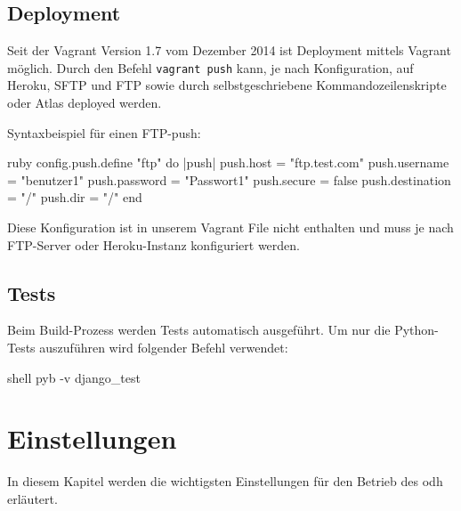 \subsection{Deployment}
Seit der Vagrant Version 1.7 vom Dezember 2014 ist Deployment mittels Vagrant möglich. Durch den Befehl \texttt{vagrant push} kann, je nach Konfiguration, auf Heroku, SFTP und FTP sowie durch selbstgeschriebene Kommandozeilenskripte oder Atlas deployed werden.

Syntaxbeispiel für einen FTP-push: \cite{vagrant-deployment}
\begin{src}{ruby}
config.push.define "ftp" do |push|
  push.host = "ftp.test.com"
  push.username = "benutzer1"
  push.password = "Passwort1"
  push.secure = false
  push.destination = "/"
  push.dir = "/"
end
\end{src}
Diese Konfiguration ist in unserem Vagrant File nicht enthalten und muss je nach FTP-Server oder Heroku-Instanz konfiguriert werden.

\subsection{Tests}
Beim Build-Prozess werden Tests automatisch ausgeführt. Um nur die Python-Tests auszuführen wird folgender Befehl verwendet:
\begin{src}{shell}
pyb -v django_test
\end{src}

\section{Einstellungen}
In diesem Kapitel werden die wichtigsten Einstellungen für den Betrieb des \ac{odh} erläutert.
